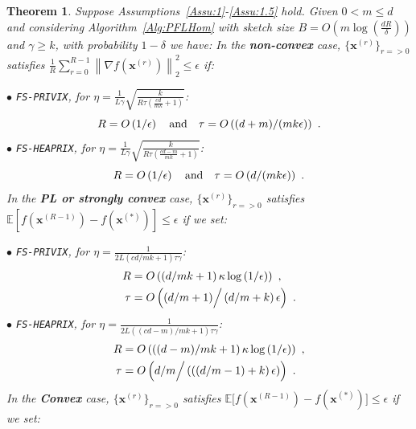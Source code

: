 \documentclass{article}
\newtheorem{theorem}{Theorem}
\begin{document}
\begin{theorem}\label{thm:homog_case}
Suppose Assumptions~\ref{Assu:1}-\ref{Assu:1.5} hold. 
Given $0<m\leq d$ and considering Algorithm~\ref{Alg:PFLHom} with sketch size $B=O\left(m\log\left(\frac{d R}{\delta}\right)\right)$ and $\gamma\geq k$, with probability $1-\delta$ we have: In the \textbf{non-convex} case, $\{ {\boldsymbol{x}}^{(r)}\}_{r=>0}$ satisfies  $\frac{1}{R}\sum_{r=0}^{R-1}\left\|\nabla f({\boldsymbol{x}}^{(r)})\right\|_2^2\leq {\epsilon}$ if: 
 
\noindent $\bullet$ \texttt{FS-PRIVIX}, for $\eta=\frac{1}{L\gamma}\sqrt{\frac{k}{R\tau\left(\frac{c d}{m k}+1\right)}}$:    
\begin{equation}\notag
R=O\left(1/\epsilon\right) \quad \textrm{and} \quad \tau=O\left(( d+m)/(mk\epsilon)\right)\ .
 \end{equation}
\noindent $\bullet$ \texttt{FS-HEAPRIX}, for $\eta=\frac{1}{L\gamma}\sqrt{\frac{k}{R\tau\left(\frac{cd-m}{mk}+1\right)}}$:
\begin{equation}\notag
R=O\left(1/\epsilon\right) \quad \textrm{and} \quad \tau=O\left(d/(mk\epsilon)\right)\ .
 \end{equation}
In the \textbf{PL or strongly convex} case, $\{ {\boldsymbol{x}}^{(r)}\}_{r=>0}$ satisfies $\mathbb{E}[f({\boldsymbol{x}}^{(R-1)})-f({\boldsymbol{x}}^{(*)})]\leq \epsilon$ if  we set:  

\noindent $\bullet$ \texttt{FS-PRIVIX}, for $\eta=\frac{1}{2L(cd/mk+1)\tau\gamma}$:    
\begin{equation}\notag
\begin{split}
R&=O\left(\left(d/mk+1\right)\kappa\log\left(1/\epsilon\right)\right)\ , \\
\tau&=O\left((d/m+1)\Big/\left(d/m+k\right)\epsilon\right)\ .
  \end{split}
 \end{equation}
\noindent $\bullet$ \texttt{FS-HEAPRIX}, for $\eta=\frac{1}{2L\left((cd-m)/mk+1\right)\tau\gamma}$:    
\begin{equation}\notag
\begin{split}
R& = O\left(\left((d-m)/mk+1\right)\kappa\log\left(1/\epsilon\right)\right)\ ,\\
 \tau &=O\left(d/m\Big/\left(\left((d/m-1)+k\right)\epsilon\right)\right)\ .
  \end{split}
\end{equation}
In the \textbf{Convex} case, $\{ {\boldsymbol{x}}^{(r)}\}_{r=>0}$ satisfies $ \mathbb{E}\Big[f({\boldsymbol{x}}^{(R-1)})-f({\boldsymbol{x}}^{(*)})\Big]\leq \epsilon$ if we set:  


\end{theorem}
\end{document}
